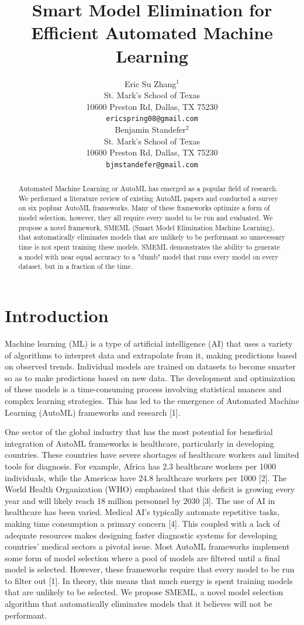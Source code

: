 \documentclass{article}
\title{Smart Model Elimination for Efficient Automated Machine Learning}
\author{%
  Eric Su Zhang$^1$ \\
  St. Mark's School of Texas\\
  10600 Preston Rd, Dallas, TX 75230\\
  \texttt{ericspring08@gmail.com} \\
  \And
  Benjamin Standefer$^2$ \\
  St. Mark's School of Texas \\
  10600 Preston Rd, Dallas, TX 75230 \\
  \texttt{bjmstandefer@gmail.com} \\
}
\begin{document}
\maketitle


\begin{abstract}
  Automated Machine Learning or AutoML has emerged as a popular field of research. We performed a literature review of existing AutoML papers and conducted a survey on six popluar AutoML frameworks. Many of these frameworks optimize a form of model selection, however, they all require every model to be run and evaluated. We propose a novel framework, SMEML (Smart Model Elimination Machine Learning), that automatically eliminates models that are unlikely to be performant so unnecessary time is not spent training these models. SMEML demonstrates the ability to generate a model with near equal accuracy to a "dumb" model that runs every model on every dataset, but in a fraction of the time.
\end{abstract}


\section{Introduction}

Machine learning (ML) is a type of artificial intelligence (AI) that uses a variety of algorithms to interpret data and extrapolate from it, making predictions based on observed trends. Individual models are trained on datasets to become smarter so as to make predictions based on new data. The development and optimization of these models is a time-consuming process involving statistical nuances and complex learning strategies. This has led to the emergence of Automated Machine Learning (AutoML) frameworks and research [1]. 

One sector of the global industry that has the most potential for beneficial integration of AutoML frameworks is healthcare, particularly in developing countries. These countries have severe shortages of healthcare workers and limited tools for diagnosis. For example, Africa has 2.3 healthcare workers per 1000 individuals, while the Americas have 24.8 healthcare workers per 1000 [2]. The World Health Organization (WHO) emphasized that this deficit is growing every year and will likely reach 18 million personnel by 2030 [3]. The use of AI in healthcare has been varied. Medical AI's typically automate repetitive tasks, making time consumption a primary concern [4]. This coupled with a lack of adequate resources makes designing faster diagnostic systems for developing countries' medical sectors a pivotal issue. 
%
Most AutoML frameworks implement some form of model selection where a pool of models are filtered until a final model is selected. However, these frameworks require that every model to be run to filter out [1]. In theory, this means that much energy is spent training models that are unlikely to be selected. We propose SMEML, a novel model selection algorithm that automatically eliminates models that it believes will not be performant. 
\end{document}
